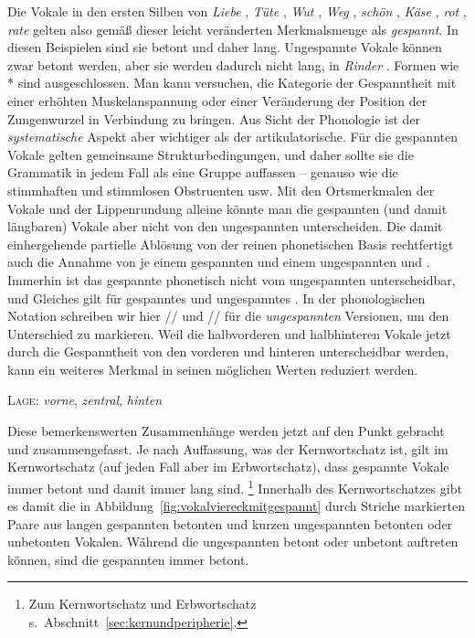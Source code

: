 Die Vokale in den ersten Silben von \textit{Liebe} \textipa{[li:b@]}, \textit{Tüte} \textipa{[ty:t@]}, \textit{Wut} \textipa{[vu:t]}, \textit{Weg} \textipa{[ve:k]}, \textit{schön} \textipa{[S\o:n]}, \textit{Käse} \textipa{[kE:z@]}, \textit{rot} \textipa{[Ko:t]}, \textit{rate} \textipa{[Ka:t@]} gelten also gemäß dieser leicht veränderten Merkmalsmenge als \textit{gespannt}.
In diesen Beispielen sind sie betont und daher lang.
Ungespannte Vokale können zwar betont werden, aber sie werden dadurch nicht lang, \zB in \textit{Rinder} \textipa{[KInd5]}.
Formen wie *\textipa{[KI:nd5]} sind ausgeschlossen.
Man kann versuchen, die Kategorie der Gespanntheit mit einer erhöhten Muskelanspannung oder einer Veränderung der Position der Zungenwurzel in Verbindung zu bringen.
Aus Sicht der Phonologie ist der \textit{systematische} Aspekt aber wichtiger als der artikulatorische.
Für die gespannten Vokale gelten gemeinsame Strukturbedingungen, und daher sollte sie die Grammatik in jedem Fall als eine Gruppe auffassen -- genauso wie die stimmhaften und stimmlosen Obstruenten usw.
Mit den Ortsmerkmalen der Vokale und der Lippenrundung alleine könnte man die gespannten (und damit längbaren) Vokale aber nicht von den ungespannten unterscheiden.
Die damit einhergehende partielle Ablösung von der reinen phonetischen Basis rechtfertigt auch die Annahme von je einem gespannten und einem ungespannten \textipa{[a]} und \textipa{[E]}.
Immerhin ist das gespannte \textipa{[a]} phonetisch nicht vom ungespannten \textipa{[a]} unterscheidbar, und Gleiches gilt für gespanntes und ungespanntes \textipa{[E]}.
In der phonologischen Notation schreiben wir hier // und // für die \textit{ungespannten} Versionen, um den Unterschied zu markieren.
Weil die halbvorderen und halbhinteren Vokale jetzt durch die Gespanntheit von den vorderen und hinteren unterscheidbar werden, kann ein weiteres Merkmal in seinen möglichen Werten reduziert werden.

\begin{exe}
  \ex \textsc{Lage}: \textit{vorne}, \textit{zentral}, \textit{hinten}
\end{exe}

Diese bemerkenswerten Zusammenhänge werden jetzt auf den Punkt gebracht und zusammengefasst.
Je nach Auffassung, was der Kernwortschatz ist, gilt im Kernwortschatz (auf jeden Fall aber im Erbwortschatz), dass gespannte Vokale immer betont und damit immer lang sind.%
\footnote{Zum Kernwortschatz und Erbwortschatz s.\ Abschnitt~\ref{sec:kernundperipherie}.}
Innerhalb des Kernwortschatzes gibt es damit die in Abbildung~\ref{fig:vokalviereckmitgespannt} durch Striche markierten Paare aus langen gespannten betonten und kurzen ungespannten betonten oder unbetonten Vokalen.
Während die ungespannten betont oder unbetont auftreten können, sind die gespannten immer betont.

